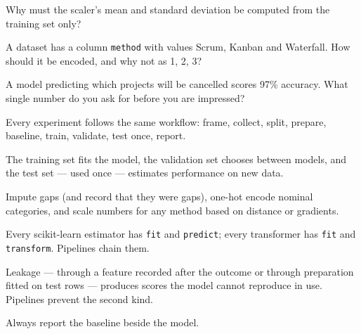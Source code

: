 \begin{checkpoint}
\begin{tightnum}
  \item Why must the scaler's mean and standard deviation be computed from the
        training set only?
  \item A dataset has a column \texttt{method} with values Scrum, Kanban and
        Waterfall. How should it be encoded, and why not as 1, 2, 3?
  \item A model predicting which projects will be cancelled scores 97\% accuracy.
        What single number do you ask for before you are impressed?
\end{tightnum}
\end{checkpoint}

\begin{chaptersummary}
\begin{tight}
  \item Every experiment follows the same workflow: frame, collect, split,
        prepare, baseline, train, validate, test once, report.
  \item The training set fits the model, the validation set chooses between
        models, and the test set --- used once --- estimates performance on new
        data.
  \item Impute gaps (and record that they were gaps), one-hot encode nominal
        categories, and scale numbers for any method based on distance or
        gradients.
  \item Every scikit-learn estimator has \texttt{fit} and \texttt{predict}; every
        transformer has \texttt{fit} and \texttt{transform}. Pipelines chain them.
  \item Leakage --- through a feature recorded after the outcome or through
        preparation fitted on test rows --- produces scores the model cannot
        reproduce in use. Pipelines prevent the second kind.
  \item Always report the baseline beside the model.
\end{tight}
\end{chaptersummary}

